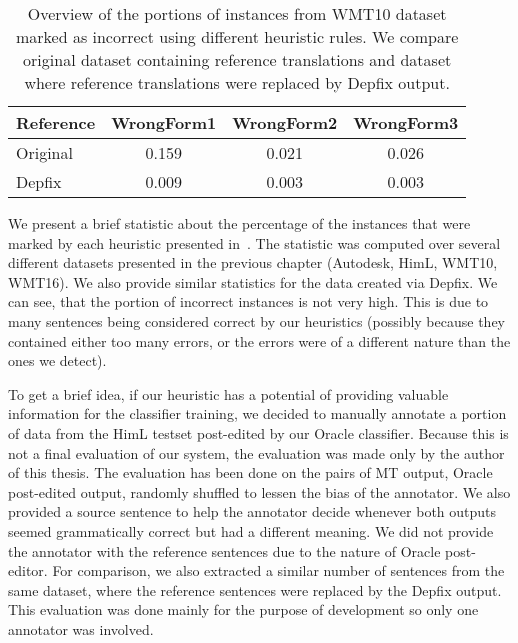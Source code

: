 \begin{table*}[t]
\centering
\small

\begin{tabular}{lccc}
Reference  &  WrongForm1  &  WrongForm2  &  WrongForm3  \\
\hline
Original  &  0.159  &  0.021  &  0.026  \\
Depfix  & 0.009  &  0.003  &  0.003  \\
\end{tabular}
\caption[Comparison of the heuristic rules]{
Overview of the portions of instances from WMT10 dataset marked as incorrect using different heuristic rules.
We compare original dataset containing reference translations and dataset where reference translations
were replaced by Depfix output.
}
\label{marked-stats}
\end{table*}


We present a brief statistic about the percentage of the instances that were marked by each
heuristic presented in~. The statistic was computed over several different
datasets presented in the previous chapter (Autodesk, HimL, WMT10, WMT16). We also provide
similar statistics for the data created via Depfix. We can see, that the portion of incorrect instances
is not very high. This is due to many sentences being considered correct by our heuristics (possibly because
they contained either too many errors, or the errors were of a different nature than the ones we detect).

To get a brief idea, if our heuristic has a potential of providing valuable information for the classifier
training, we decided to manually annotate a portion of data from the HimL testset post-edited by our
Oracle classifier. Because this is not a final evaluation of our system, the evaluation was made only
by the author of this thesis. The evaluation has been done on the pairs of MT output, Oracle post-edited
output, randomly shuffled to lessen the bias of the annotator. We also provided a source sentence
to help the annotator decide whenever both outputs seemed grammatically correct but had a different meaning.
We did not provide the annotator with the reference sentences due to the nature of Oracle post-editor. For comparison, we also extracted
a similar number of sentences from the same dataset, where the reference sentences were replaced
by the Depfix output. This evaluation was done mainly for the purpose
of development so only one annotator was involved.

